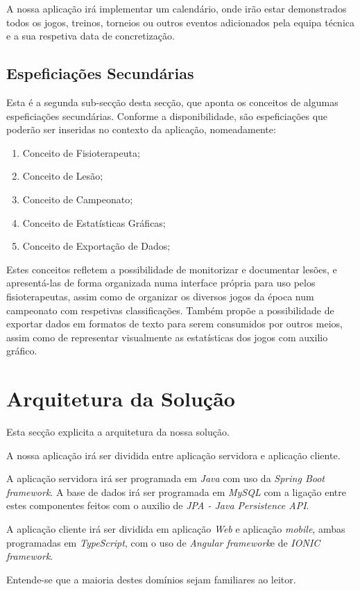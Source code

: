 A nossa aplicação irá implementar um calendário, onde irão estar demonstrados todos os jogos, treinos, torneios ou outros eventos adicionados pela equipa técnica e a sua respetiva data de concretização.



\subsection{Espeficiações Secundárias} \label{sec222}
Esta é a segunda sub-secção desta secção, que aponta os conceitos de algumas espeficiações secundárias. Conforme a disponibilidade, são espeficiações que poderão ser inseridas no contexto da aplicação, nomeadamente:
\begin{enumerate}
	\item Conceito de Fisioterapeuta;
	\item Conceito de Lesão;
	\item Conceito de Campeonato;
	\item Conceito de Estatísticas Gráficas;
	\item Conceito de Exportação de Dados;
\end{enumerate}

Estes conceitos refletem a possibilidade de monitorizar e documentar lesões, e apresentá-las de forma organizada numa interface própria para uso pelos fisioterapeutas, assim como de organizar os diversos jogos da época num campeonato com respetivas classificações. Também propõe a possibilidade de exportar dados em formatos de texto para serem consumidos por outros meios, assim como de representar visualmente as estatísticas dos jogos com auxilio gráfico.

\section{Arquitetura da Solução}\label{sec23}
Esta secção explicita a arquitetura da nossa solução.

A nossa aplicação irá ser dividida entre aplicação servidora e aplicação cliente.

A aplicação servidora irá ser programada em \emph{Java} com uso da \emph{Spring Boot framework}. A base de dados irá ser programada em \emph{MySQL} com a ligação entre estes componentes feitos com o auxilio de \emph{JPA - Java Persistence API}.

A aplicação cliente irá ser dividida em aplicação \emph{Web} e aplicação \emph{mobile}, ambas programadas em \emph{TypeScript}, com o uso de \emph{Angular framework}e de \emph{IONIC framework}.

Entende-se que a maioria destes domínios sejam familiares ao leitor.

